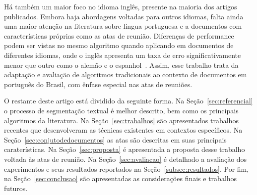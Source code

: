 Há também um maior foco no idioma inglês, presente na maioria dos artigos publicados. Embora haja abordagens voltadas para outros idiomas, falta ainda uma maior atenção na literatura sobre língua portuguesa e a documentos com características próprias como as atas de reunião.
%
Diferenças de performance podem ser vistas no mesmo algoritmo quando aplicando em documentos de diferentes idiomas, onde o inglês apresenta um taxa de erro significativamente menor que outro como o alemão e o espanhol~\cite{Kern2009}.
%
%
Assim, esse trabalho trata da adaptação e avaliação de algoritmos tradicionais ao contexto de documentos em português do Brasil, com ênfase especial nas atas de reuniões.

O restante deste artigo está dividido da seguinte forma. 
%
Na Seção~\ref{sec:referencial} o processo de segmentação textual é melhor descrito, bem como os principais algoritmos da literatura. 
%
Na Seção~\ref{sec:trabalhos} são apresentados trabalhos recentes que desenvolveram as técnicas existentes em contextos específicos. 
%
Na Seção~\ref{sec:conjutodedocumentos} as atas são descritas em suas principais caraterísticas.
%
Na Seção~\ref{sec:proposta} é apresentada a proposta desse trabalho voltada às atas de reunião. 
Na Seção~\ref{sec:avaliacao} é detalhado a avaliação dos experimentos e seus resultados reportados na Seção~\ref{subsec:resultados}. 
%
Por fim, na Seção~\ref{sec:conclusao} são apresentadas as considerações finais e trabalhos futuros.















